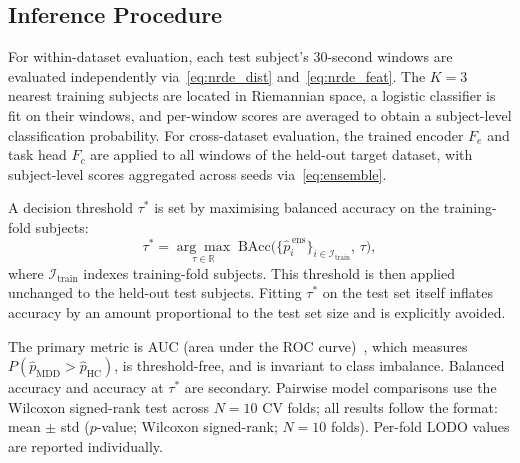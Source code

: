 \subsection{Inference Procedure}
\label{sec:evaluation}

For within-dataset evaluation, each test subject's 30-second windows are
evaluated independently via~\eqref{eq:nrde_dist} and~\eqref{eq:nrde_feat}.
The $K=3$ nearest training subjects are located in Riemannian space, a logistic
classifier is fit on their windows, and per-window scores are averaged to obtain
a subject-level classification probability.
For cross-dataset evaluation, the trained encoder $F_e$ and task head $F_c$
are applied to all windows of the held-out target dataset, with subject-level
scores aggregated across seeds via~\eqref{eq:ensemble}.

A decision threshold $\tau^*$ is set by maximising balanced accuracy on the
training-fold subjects:
\begin{equation}
  \tau^* = \underset{\tau\in\mathbb{R}}{\arg\max}
    \;\mathrm{BAcc}\!\bigl(\{\hat{p}_i^{\,\mathrm{ens}}\}_{i\in\mathcal{I}_\mathrm{train}},\,\tau\bigr),
  \label{eq:thresh}
\end{equation}
where $\mathcal{I}_\mathrm{train}$ indexes training-fold subjects.
This threshold is then applied unchanged to the held-out test subjects.
Fitting $\tau^*$ on the test set itself inflates accuracy by an amount
proportional to the test set size and is explicitly avoided.

The primary metric is AUC (area under the ROC curve)~\cite{fawcett2006roc},
which measures $P(\hat{p}_\mathrm{MDD}>\hat{p}_\mathrm{HC})$, is threshold-free,
and is invariant to class imbalance.
Balanced accuracy and accuracy at $\tau^*$ are secondary.
Pairwise model comparisons use the Wilcoxon signed-rank test across $N=10$ CV
folds; all results follow the format: mean $\pm$ std ($p$-value; Wilcoxon
signed-rank; $N=10$ folds). Per-fold LODO values are reported individually.
